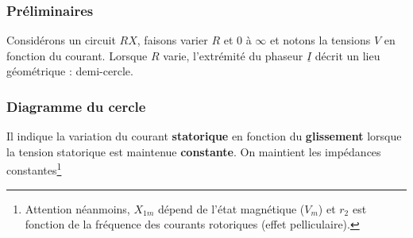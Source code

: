 		\subsubsection{Préliminaires}
		Considérons un circuit $RX$, faisons varier $R$ et 0 à $\infty$ et notons la 
		tensions $V$ en fonction du courant. Lorsque $R$ varie, l'extrémité du phaseur 
		$\underline{I}$ décrit un lieu géométrique : demi-cercle.

		\subsubsection{Diagramme du cercle}
		Il indique la variation du courant \textbf{statorique} en fonction du 
		\textbf{glissement} lorsque la tension statorique est maintenue \textbf{constante}. 
		On maintient les impédances constantes\footnote{Attention néanmoins, $X_{1m}$ dépend 
		de l'état magnétique ($V_m$) et $r_2$ est fonction de la fréquence des courants 
		rotoriques (effet pelliculaire).}

